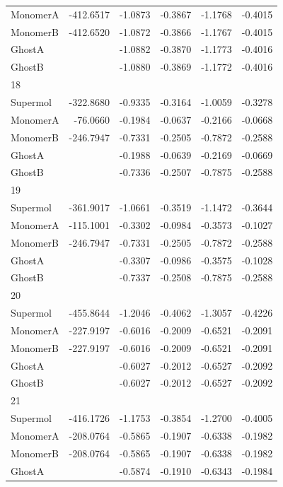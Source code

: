 \documentclass[journal=jctcce,manuscript=article]{achemso}
\begin{document}
\begin{spacing}{1}
\begin{longtable}{lRRRRR}
    MonomerA & -412.6517 & -1.0873 & -0.3867 & -1.1768 & -0.4015 \\
    MonomerB & -412.6520 & -1.0872 & -0.3866 & -1.1767 & -0.4015 \\
    GhostA &  & -1.0882 & -0.3870 & -1.1773 & -0.4016 \\
    GhostB &  & -1.0880 & -0.3869 & -1.1772 & -0.4016 \\
    18 &  &  &  &  &  \\
    Supermol & -322.8680 & -0.9335 & -0.3164 & -1.0059 & -0.3278 \\
    MonomerA & -76.0660 & -0.1984 & -0.0637 & -0.2166 & -0.0668 \\
    MonomerB & -246.7947 & -0.7331 & -0.2505 & -0.7872 & -0.2588 \\
    GhostA &  & -0.1988 & -0.0639 & -0.2169 & -0.0669 \\
    GhostB &  & -0.7336 & -0.2507 & -0.7875 & -0.2588 \\
    19 &  &  &  &  &  \\
    Supermol & -361.9017 & -1.0661 & -0.3519 & -1.1472 & -0.3644 \\
    MonomerA & -115.1001 & -0.3302 & -0.0984 & -0.3573 & -0.1027 \\
    MonomerB & -246.7947 & -0.7331 & -0.2505 & -0.7872 & -0.2588 \\
    GhostA &  & -0.3307 & -0.0986 & -0.3575 & -0.1028 \\
    GhostB &  & -0.7337 & -0.2508 & -0.7875 & -0.2588 \\
    20 &  &  &  &  &  \\
    Supermol & -455.8644 & -1.2046 & -0.4062 & -1.3057 & -0.4226 \\
    MonomerA & -227.9197 & -0.6016 & -0.2009 & -0.6521 & -0.2091 \\
    MonomerB & -227.9197 & -0.6016 & -0.2009 & -0.6521 & -0.2091 \\
    GhostA &  & -0.6027 & -0.2012 & -0.6527 & -0.2092 \\
    GhostB &  & -0.6027 & -0.2012 & -0.6527 & -0.2092 \\
    21 &  &  &  &  &  \\
    Supermol & -416.1726 & -1.1753 & -0.3854 & -1.2700 & -0.4005 \\
    MonomerA & -208.0764 & -0.5865 & -0.1907 & -0.6338 & -0.1982 \\
    MonomerB & -208.0764 & -0.5865 & -0.1907 & -0.6338 & -0.1982 \\
    GhostA &  & -0.5874 & -0.1910 & -0.6343 & -0.1984 \\

\end{longtable}
\end{spacing}
\end{document}
